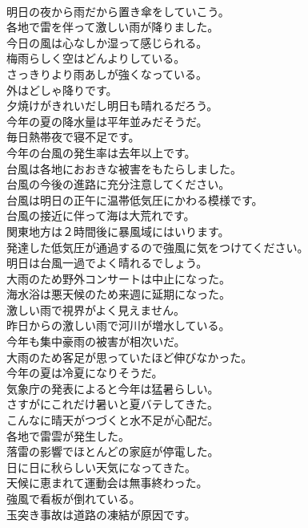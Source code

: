 \documentclass[8pt]{extreport}
\begin{document}
\begin{CJK}{UTF8}{min}
\\	明日の夜から雨だから置き傘をしていこう。	
\\	各地で雷を伴って激しい雨が降りました。	
\\	今日の風は心なしか湿って感じられる。	
\\	梅雨らしく空はどんよりしている。	
\\	さっきりより雨あしが強くなっている。	
\\	外はどしゃ降りです。	
\\	夕焼けがきれいだし明日も晴れるだろう。	
\\	今年の夏の降水量は平年並みだそうだ。	
\\	毎日熱帯夜で寝不足です。	
\\	今年の台風の発生率は去年以上です。	
\\	台風は各地におおきな被害をもたらしました。	
\\	台風の今後の進路に充分注意してください。	
\\	台風は明日の正午に温帯低気圧にかわる模様です。	
\\	台風の接近に伴って海は大荒れです。	
\\	関東地方は２時間後に暴風域にはいります。	
\\	発達した低気圧が通過するので強風に気をつけてください。	
\\	明日は台風一過でよく晴れるでしょう。	
\\	大雨のため野外コンサートは中止になった。	
\\	海水浴は悪天候のため来週に延期になった。	
\\	激しい雨で視界がよく見えません。	
\\	昨日からの激しい雨で河川が増水している。	
\\	今年も集中豪雨の被害が相次いだ。	
\\	大雨のため客足が思っていたほど伸びなかった。	
\\	今年の夏は冷夏になりそうだ。	
\\	気象庁の発表によると今年は猛暑らしい。	
\\	さすがにこれだけ暑いと夏バテしてきた。	
\\	こんなに晴天がつづくと水不足が心配だ。	
\\	各地で雷雲が発生した。	
\\	落雷の影響でほとんどの家庭が停電した。	
\\	日に日に秋らしい天気になってきた。	
\\	天候に恵まれて運動会は無事終わった。	
\\	強風で看板が倒れている。	
\\	玉突き事故は道路の凍結が原因です。	

\end{CJK}
\end{document}

